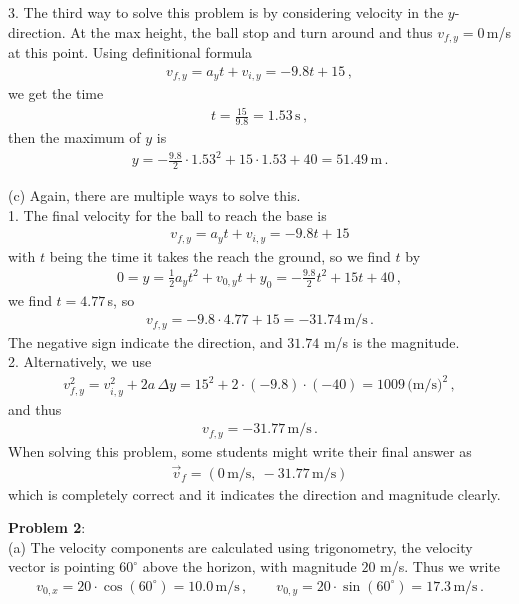 \documentclass[11pt, onesided]{book}
\theoremstyle{break}
\theoremstyle{break}
\begin{document}
3. The third way to solve this problem is by considering velocity in the $y$-direction. At the max height, the ball stop and turn around and thus $v_{f,y} = 0\,$m/s at this point. Using definitional formula
\begin{align*}
v_{f,y} = a_y t + v_{i,y} = -9.8 t + 15\,,
\end{align*} 
we get the time
\begin{align*}
t = \frac{15}{9.8} = 1.53\,\text{s}\,,
\end{align*}
then the maximum of $y$ is
\begin{align*}
y = -\frac{9.8}{2} \cdot 1.53^2 + 15 \cdot 1.53 + 40= 51.49\,\text{m}\,.
\end{align*}

(c) Again, there are multiple ways to solve this.\\

1. The final velocity for the ball to reach the base is 
\begin{align*}
v_{f,y} = a_y t + v_{i,y} = -9.8 t + 15
\end{align*}
with $t$ being the time it takes the reach the ground, so we find $t$ by
\begin{align*}
0 = y = \frac{1}{2}a_y t^2 + v_{0,y} t+ y_0 = -\frac{9.8}{2} t^2 + 15 t + 40\,,
\end{align*}
we find $t = 4.77\,$s, so 
\begin{align*}
v_{f,y} = -9.8 \cdot 4.77 + 15=-31.74\,\text{m/s}\,.
\end{align*}
The negative sign indicate the direction, and $31.74$ m/s is the magnitude.\\

2. Alternatively, we use
\begin{align*}
v_{f,y}^2 = v_{i,y}^2 + 2a\,\Delta y = 15^2 + 2\cdot (-9.8)\cdot (-40)=1009\,\text{(m/s)}^2\,,
\end{align*}
and thus
\begin{align*}
v_{f,y}=-31.77\,\text{m/s}\,.
\end{align*}
When solving this problem, some students might write their final answer as
\begin{align*}
\vec{v}_{f} = (0\,\text{m/s},\ -31.77\,\text{m/s})
\end{align*}
which is completely correct and it indicates the direction and magnitude clearly.


\newpage
\noindent\textbf{Problem 2}:\\

(a) The velocity components are calculated using trigonometry, the velocity vector is pointing $60^\circ$ above the horizon, with magnitude $20$ m/s. Thus we write
\begin{align*}
v_{0,x} = 20\cdot \cos(60^\circ) = 10.0\,\text{m/s}\,,\qquad
v_{0,y} = 20\cdot \sin(60^\circ) = 17.3\,\text{m/s}\,.
\end{align*}
\end{document}

